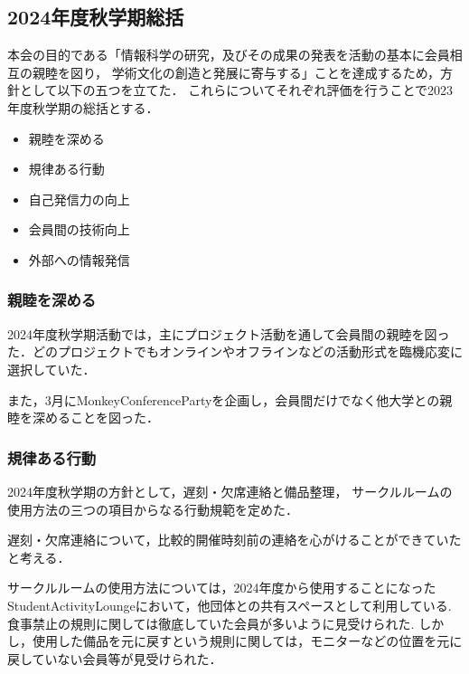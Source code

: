 \subsection*{2024年度秋学期総括}


本会の目的である「情報科学の研究，及びその成果の発表を活動の基本に会員相互の親睦を図り，
学術文化の創造と発展に寄与する」ことを達成するため，方針として以下の五つを立てた．
これらについてそれぞれ評価を行うことで2023年度秋学期の総括とする．

\begin{itemize}
    \item 親睦を深める
    \item 規律ある行動
    \item 自己発信力の向上
    \item 会員間の技術向上
    \item 外部への情報発信
\end{itemize}

\subsubsection*{親睦を深める}
    2024年度秋学期活動では，主にプロジェクト活動を通して会員間の親睦を図った．どのプロジェクトでもオンラインやオフラインなどの活動形式を臨機応変に選択していた．

    また，3月にMonkeyConferencePartyを企画し，会員間だけでなく他大学との親睦を深めることを図った．

\subsubsection*{規律ある行動}
    2024年度秋学期の方針として，遅刻・欠席連絡と備品整理，
    サークルルームの使用方法の三つの項目からなる行動規範を定めた．

    遅刻・欠席連絡について，比較的開催時刻前の連絡を心がけることができていたと考える．

    サークルルームの使用方法については，2024年度から使用することになったStudentActivityLoungeにおいて，他団体との共有スペースとして利用している.
    食事禁止の規則に関しては徹底していた会員が多いように見受けられた.
    しかし，使用した備品を元に戻すという規則に関しては，モニターなどの位置を元に戻していない会員等が見受けられた．

